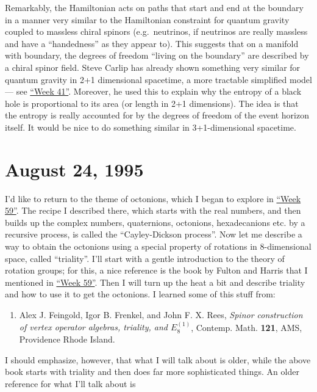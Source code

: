 \documentclass{article}
\def\tightlist{}
\begin{document}
Remarkably, the Hamiltonian acts on paths that start and end at the
boundary in a manner very similar to the Hamiltonian constraint for
quantum gravity coupled to massless chiral spinors (e.g.~neutrinos, if
neutrinos are really massless and have a ``handedness'' as they appear
to). This suggests that on a manifold with boundary, the degrees of
freedom ``living on the boundary'' are described by a chiral spinor
field. Steve Carlip has already shown something very similar for quantum
gravity in 2+1 dimensional spacetime, a more tractable simplified model
--- see \protect\hyperlink{week41}{``Week 41''}. Moreover, he used this
to explain why the entropy of a black hole is proportional to its area
(or length in 2+1 dimensions). The idea is that the entropy is really
accounted for by the degrees of freedom of the event horizon itself. It
would be nice to do something similar in 3+1-dimensional spacetime.
\hypertarget{week61}{%
\section{August 24, 1995}\label{week61}}

I'd like to return to the theme of octonions, which I began to explore
in \protect\hyperlink{week59}{``Week 59''}. The recipe I described
there, which starts with the real numbers, and then builds up the
complex numbers, quaternions, octonions, hexadecanions etc. by a
recursive process, is called the ``Cayley-Dickson process''. Now let me
describe a way to obtain the octonions using a special property of
rotations in 8-dimensional space, called ``triality''. I'll start with a
gentle introduction to the theory of rotation groups; for this, a nice
reference is the book by Fulton and Harris that I mentioned in
\protect\hyperlink{week59}{``Week 59''}. Then I will turn up the heat a
bit and describe triality and how to use it to get the octonions. I
learned some of this stuff from:

\begin{enumerate}
\def\labelenumi{\arabic{enumi})}
\tightlist
\item
  Alex J. Feingold, Igor B. Frenkel, and John F. X. Rees, \emph{Spinor
  construction of vertex operator algebras, triality, and
  \(E_8^{(1)}\)}, Contemp. Math. \textbf{121}, AMS, Providence Rhode
  Island.
\end{enumerate}

I should emphasize, however, that what I will talk about is older, while
the above book starts with triality and then does far more sophisticated
things. An older reference for what I'll talk about is
\end{document}
